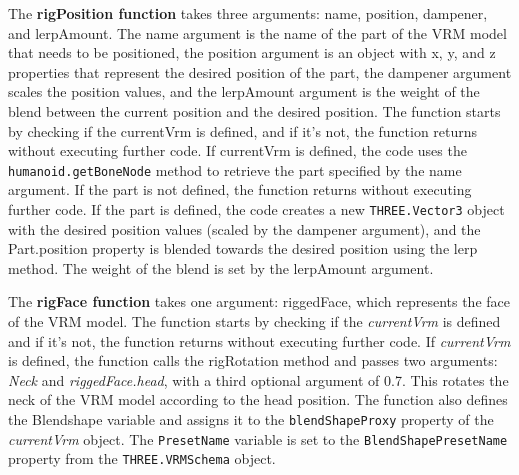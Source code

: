 The \textbf{rigPosition function} takes three arguments: name, position, dampener, and lerpAmount. The name argument is the name 
of the part of the VRM model that needs to be positioned, the position argument is an object with x, y, and z properties 
that represent the desired position of the part, the dampener argument scales the position values, and the lerpAmount 
argument is the weight of the blend between the current position and the desired position.
The function starts by checking if the currentVrm is defined, and if it's not, the function returns without executing further code. 
If currentVrm is defined, the code uses the \texttt{humanoid.getBoneNode} method to retrieve the part specified by the name argument. 
If the part is not defined, the function returns without executing further code.
If the part is defined, the code creates a new \texttt{THREE.Vector3} object with the desired position 
values (scaled by the dampener argument), and the Part.position property is blended towards the 
desired position using the lerp method. The weight of the blend is set by the lerpAmount argument.

The \textbf{rigFace function} takes one argument: riggedFace, which represents the face of the VRM model. The function starts 
by checking if the \emph{currentVrm} is defined and if it's not, the function returns without executing further code.
If \emph{currentVrm} is defined, the function calls the rigRotation method and passes two arguments: \emph{Neck} and \emph{riggedFace.head}, 
with a third optional argument of 0.7. This rotates the neck of the VRM model according to the head position.
The function also defines the Blendshape variable and assigns it to the \texttt{blendShapeProxy} property of the \emph{currentVrm} object. 
The \texttt{PresetName} variable is set to the \texttt{BlendShapePresetName} property from the \texttt{THREE.VRMSchema} object.

